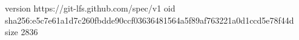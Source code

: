 version https://git-lfs.github.com/spec/v1
oid sha256:e5c7e61a1d7c260fbdde90ccf03636481564a5f89af763221a0d1ccd5e78f44d
size 2836
